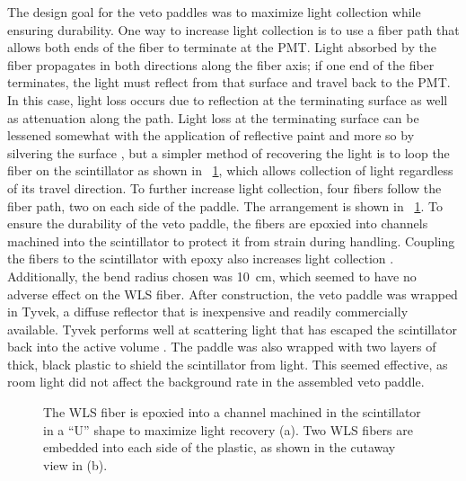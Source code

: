The design goal for the veto paddles was to maximize light collection while ensuring durability.  One way to increase light collection is to use a fiber path that allows both ends of the fiber to terminate at the PMT.  Light absorbed by the fiber propagates in both directions along the fiber axis; if one end of the fiber terminates, the light must reflect from that surface and travel back to the PMT.  In this case, light loss occurs due to reflection at the terminating surface as well as attenuation along the path.  Light loss at the terminating surface can be lessened somewhat with the application of reflective paint and more so by silvering the surface \citep{WLS_mirrorFinish}, but a simpler method of recovering the light is to loop the fiber on the scintillator as shown in {\fig}~\ref{fig:paddle}, which allows collection of light regardless of its travel direction.  To further increase light collection, four fibers follow the fiber path, two on each side of the paddle.  The arrangement is shown in {\fig}~\ref{fig:paddle}.  To ensure the durability of the veto paddle, the fibers are epoxied into channels machined into the scintillator to protect it from strain during handling.  Coupling the fibers to the scintillator with epoxy also increases light collection \citep{Aguillion_scintTiles}.  Additionally, the bend radius chosen was 10~cm, which seemed to have no adverse effect on the WLS fiber.  After construction, the veto paddle was wrapped in Tyvek, a diffuse reflector that is inexpensive and readily commercially available.  Tyvek performs well at scattering light that has escaped the scintillator back into the active volume \citep{YongWeiTyvek}.  The paddle was also wrapped with two layers of thick, black plastic to shield the scintillator from light.  This seemed effective, as room light did not affect the background rate in the assembled veto paddle.  
\begin{figure}[!htbp]
\centering
{}
\caption[A view of the channel cut into the scintillator for the WLS fiber.]{The WLS fiber is epoxied into a channel machined in the scintillator in a ``U'' shape to maximize light recovery (a).  Two WLS fibers are embedded into each side of the plastic, as shown in the cutaway view in (b).}
\label{fig:paddle}
\end{figure}

